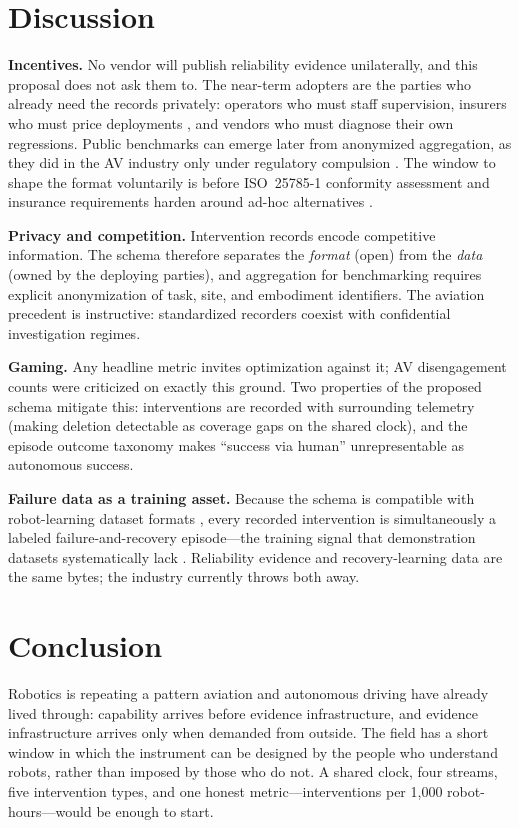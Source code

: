 \documentclass[11pt]{article}
\begin{document}
\section{Discussion}

\textbf{Incentives.} No vendor will publish reliability evidence
unilaterally, and this proposal does not ask them to. The near-term
adopters are the parties who already need the records privately: operators
who must staff supervision, insurers who must price deployments
\citep{humanoidliability2026}, and vendors who must diagnose their own
regressions. Public benchmarks can emerge later from anonymized
aggregation, as they did in the AV industry only under regulatory
compulsion \citep{dmv2024disengagement}. The window to shape the format
voluntarily is before ISO~25785-1 conformity assessment and insurance
requirements harden around ad-hoc alternatives \citep{iso25785}.

\textbf{Privacy and competition.} Intervention records encode competitive
information. The schema therefore separates the \emph{format} (open) from
the \emph{data} (owned by the deploying parties), and aggregation for
benchmarking requires explicit anonymization of task, site, and embodiment
identifiers. The aviation precedent is instructive: standardized recorders
coexist with confidential investigation regimes.

\textbf{Gaming.} Any headline metric invites optimization against it; AV
disengagement counts were criticized on exactly this ground. Two properties
of the proposed schema mitigate this: interventions are recorded with
surrounding telemetry (making deletion detectable as coverage gaps on the
shared clock), and the episode outcome taxonomy makes ``success via human''
unrepresentable as autonomous success.

\textbf{Failure data as a training asset.} Because the schema is compatible
with robot-learning dataset formats \citep{ramos2021rlds, cadene2024lerobot},
every recorded intervention is simultaneously a labeled failure-and-recovery
episode---the training signal that demonstration datasets systematically
lack \citep{evsint2026teleop}. Reliability evidence and recovery-learning
data are the same bytes; the industry currently throws both away.

\section{Conclusion}

Robotics is repeating a pattern aviation and autonomous driving have
already lived through: capability arrives before evidence infrastructure,
and evidence infrastructure arrives only when demanded from outside. The
field has a short window in which the instrument can be designed by the
people who understand robots, rather than imposed by those who do not. A
shared clock, four streams, five intervention types, and one honest
metric---interventions per 1,000 robot-hours---would be enough to start.



\end{document}
